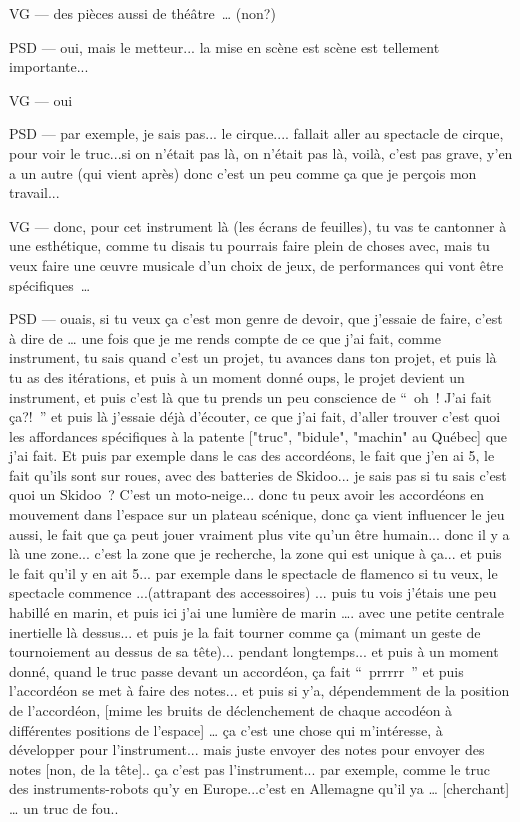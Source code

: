VG — des pièces aussi de théâtre … (non?) 

PSD — oui, mais le metteur... la mise en scène est scène est tellement importante...  

VG — oui 

PSD — par exemple, je sais pas... le cirque.... fallait aller au spectacle de cirque, pour voir le truc...si on n'était pas là, on n'était pas là, voilà, c'est pas grave, y'en a un autre (qui vient après) donc c'est un peu comme ça que je perçois mon travail...  

VG — donc, pour cet instrument là (les écrans de feuilles), tu vas te cantonner à une esthétique, comme tu disais tu pourrais faire plein de choses avec, mais tu veux faire une œuvre musicale d'un choix de jeux, de performances qui vont être spécifiques … 

PSD — ouais, si tu veux ça c'est mon genre de devoir, que j'essaie de faire, c'est à dire de … une fois que je me rends compte de ce que j'ai fait, comme instrument, tu sais quand c'est un projet, tu avances dans ton projet, et puis là tu as des itérations, et puis à un moment donné oups, le projet devient un instrument, et puis c'est là que tu prends un peu conscience de “ oh ! J'ai fait ça?! ” et puis là j'essaie déjà d'écouter, ce que j'ai fait, d'aller trouver c'est quoi les affordances spécifiques à la patente ["truc", "bidule", "machin" au Québec] que j'ai fait. Et puis par exemple dans le cas des accordéons, le fait que j'en ai 5, le fait qu'ils sont sur roues, avec des batteries de Skidoo... je sais pas si tu sais c'est quoi un Skidoo ? C'est un moto-neige... donc tu peux avoir les accordéons en mouvement dans l'espace sur un plateau scénique, donc ça vient influencer le jeu aussi, le fait que ça peut jouer vraiment plus vite qu'un être humain... donc il y a là une zone... c'est la zone que je recherche, la zone qui est unique à ça... et puis le fait qu'il y en ait 5... par exemple dans le spectacle de flamenco si tu veux, le spectacle commence ...(attrapant des accessoires) ... puis tu vois j'étais une peu habillé en marin, et puis ici j'ai une lumière de marin …. avec une petite centrale inertielle là dessus... et puis je la fait tourner comme ça (mimant un geste de tournoiement au dessus de sa tête)... pendant longtemps... et puis à un moment donné, quand le truc passe devant un accordéon, ça fait “ prrrrr ” et puis l'accordéon se met à faire des notes... et puis si y'a, dépendemment de la position de l'accordéon, [mime les bruits de déclenchement de chaque accodéon à différentes positions de l'espace] … ça c'est une chose qui m'intéresse, à développer pour l'instrument... mais juste envoyer des notes pour envoyer des notes [non, de la tête].. ça c'est pas l'instrument... par exemple, comme le truc des instruments-robots qu'y en Europe...c'est en Allemagne qu'il ya  … [cherchant] … un truc de fou..  

